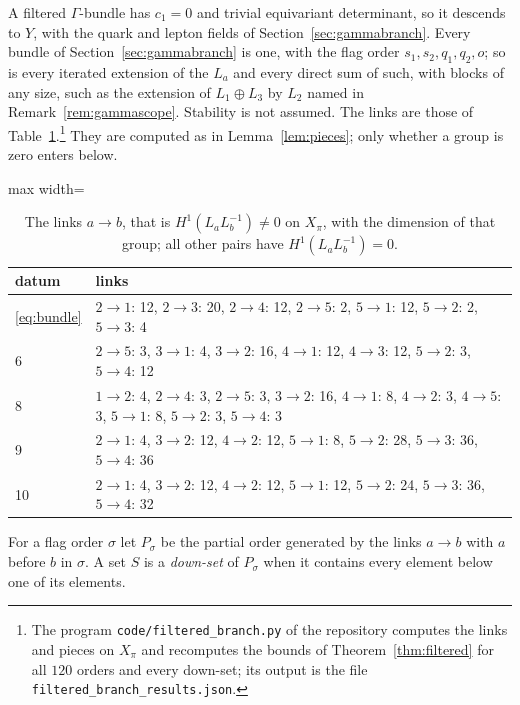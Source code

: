 A filtered $\Gamma$-bundle has $c_1=0$ and trivial equivariant
determinant, so it descends to $Y$, with the quark and lepton fields of
Section~\ref{sec:gammabranch}. Every bundle of Section~\ref{sec:gammabranch}
is one, with the flag order $s_1,s_2,q_1,q_2,o$; so is every iterated
extension of the $L_a$ and every direct sum of such, with blocks of any
size, such as the extension of $L_1\oplus L_3$ by $L_2$ named in
Remark~\ref{rem:gammascope}. Stability is not assumed. The links are
those of Table~\ref{tab:links}.\footnote{The program
\texttt{code/filtered\_branch.py} of the repository computes the links and
pieces on $X_\pi$ and recomputes the bounds of
Theorem~\ref{thm:filtered} for all $120$ orders and every down-set; its
output is the file \texttt{filtered\_branch\_results.json}.} They are
computed as in Lemma~\ref{lem:pieces}; only whether a group is zero enters
below.

\begin{table}[t]\small\centering
\caption{The links $a\to b$, that is $H^1(L_aL_b^{-1})\ne0$ on $X_\pi$,
with the dimension of that group; all other pairs have
$H^1(L_aL_b^{-1})=0$.}\label{tab:links}
\begin{adjustbox}{max width=\linewidth}
\begin{tabular}{@{}ll@{}}
\toprule
datum & links\\\midrule
\eqref{eq:bundle} & $2\to1$: 12, $2\to3$: 20, $2\to4$: 12, $2\to5$: 2, $5\to1$: 12, $5\to2$: 2, $5\to3$: 4\\
6 & $2\to5$: 3, $3\to1$: 4, $3\to2$: 16, $4\to1$: 12, $4\to3$: 12, $5\to2$: 3, $5\to4$: 12\\
8 & $1\to2$: 4, $2\to4$: 3, $2\to5$: 3, $3\to2$: 16, $4\to1$: 8, $4\to2$: 3, $4\to5$: 3, $5\to1$: 8, $5\to2$: 3, $5\to4$: 3\\
9 & $2\to1$: 4, $3\to2$: 12, $4\to2$: 12, $5\to1$: 8, $5\to2$: 28, $5\to3$: 36, $5\to4$: 36\\
10 & $2\to1$: 4, $3\to2$: 12, $4\to2$: 12, $5\to1$: 12, $5\to2$: 24, $5\to3$: 36, $5\to4$: 32\\
\bottomrule
\end{tabular}
\end{adjustbox}
\end{table}

For a flag order $\sigma$ let $P_\sigma$ be the partial order generated by
the links $a\to b$ with $a$ before $b$ in $\sigma$. A set $S$ is a
\emph{down-set} of $P_\sigma$ when it contains every element below one of
its elements.

